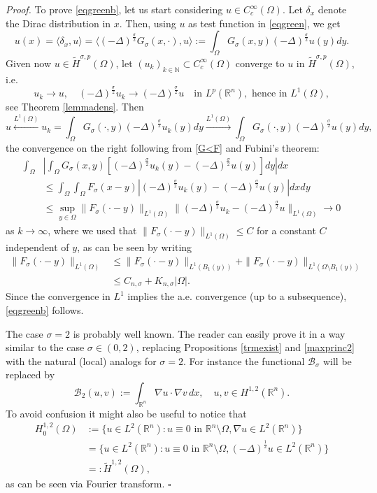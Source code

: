 \documentclass[11pt, a4paper]{article}
\newcommand{\R}{\mathbb{R}}
\newenvironment{proof}{\noindent\emph{Proof.}}{\phantom{ } \hfill$\square$\medskip}
\begin{document}
\begin{proof}
To prove \eqref{eqgreenb}, let us start considering $u\in C^\infty_c(\Omega).$ Let $\delta_x$ denote the Dirac distribution in $x$. Then, using $u$ as test function in \eqref{eqgreen}, we get
$$u(x)=\langle \delta_x,u\rangle=\langle (-\Delta)^\frac{\sigma}{2} G_\sigma(x,\cdot),u\rangle:=\int_\Omega G_\sigma(x,y)(-\Delta)^\frac{\sigma}{2} u(y)dy.$$
Given now $u\in \tilde H^{\sigma,p}(\Omega)$, let $(u_k)_{k\in \mathbb{N}}\subset C^\infty_c(\Omega)$ converge to $u$ in $\tilde H^{\sigma,p}(\Omega)$, i.e.
$$u_k\to u,\quad (-\Delta)^\frac{\sigma}{2} u_k\to (-\Delta)^\frac{\sigma}{2} u\quad \text{in }L^p(\R^n), \text{ hence in }L^1(\Omega),$$
see Theorem \ref{lemmadens}. Then
$$u \overset{L^1(\Omega)}\longleftarrow u_k=\int_\Omega G_\sigma(\cdot ,y)(-\Delta)^\frac{\sigma}{2} u_k(y)dy\overset{L^1(\Omega)}\longrightarrow \int_\Omega G_\sigma(\cdot ,y)(-\Delta)^\frac{\sigma}{2} u(y)dy,$$
the convergence on the right following from \eqref{G<F} and Fubini's theorem:
\[
\begin{split}
\int_\Omega &\left|\int_\Omega G_\sigma(x,y)\left[(-\Delta)^\frac{\sigma}{2} u_k(y)- (-\Delta)^\frac{\sigma}{2} u(y)\right]dy \right|dx\\
&\le \int_\Omega \int_\Omega F_\sigma (x-y)\left|(-\Delta)^\frac{\sigma}{2} u_k(y)- (-\Delta)^\frac{\sigma}{2} u(y)\right| dx dy\\
&\le \sup_{y\in \Omega}\|F_\sigma(\cdot -y)\|_{L^1(\Omega)} \|(-\Delta)^\frac{\sigma}{2} u_k- (-\Delta)^\frac{\sigma}{2} u\|_{L^1(\Omega)}\to 0
\end{split}
\]
as $k\to \infty$, where we used that $\|F_\sigma(\cdot-y)\|_{L^1(\Omega)}\le C$ for a constant $C$ independent of $y$, as can be seen by writing
\[\begin{split}
\|F_\sigma(\cdot-y)\|_{L^1(\Omega)}&\le \|F_\sigma(\cdot-y)\|_{L^1(B_1(y))}+\|F_\sigma(\cdot-y)\|_{L^1(\Omega\setminus B_1(y))}\\
&\le C_{n,\sigma}+K_{n,\sigma}|\Omega|.
\end{split}\]
Since the convergence in $L^1$ implies the a.e. convergence (up to a subsequence), \eqref{eqgreenb} follows.

The case $\sigma=2$ is probably well known. The reader can easily prove it in a way similar to the case $\sigma\in (0,2)$, replacing Propositions \ref{trmexist} and \ref{maxprinc2} with the natural (local) analogs for $\sigma=2$. For instance the functional $\mathcal{B}_\sigma$ will be replaced by
$$\mathcal{B}_2(u,v):=\int_{\R^n}\nabla u\cdot \nabla v \,dx,\quad u,v\in H^{1,2}(\R^n).$$
To avoid confusion it might also be useful to notice that
\[\begin{split}
H^{1,2}_0(\Omega)&:=\{u\in L^2(\R^n):u\equiv 0\text{ in }\R^n\setminus \Omega, \nabla u\in L^2(\R^n)\}\\
&=\{u\in L^2(\R^n):u\equiv 0\text{ in }\R^n\setminus \Omega, (-\Delta)^\frac12 u\in L^2(\R^n)\}\\
&=:\tilde H^{1,2}(\Omega),
\end{split}\]
as can be seen via Fourier transform.
\end{proof}
\end{document}
